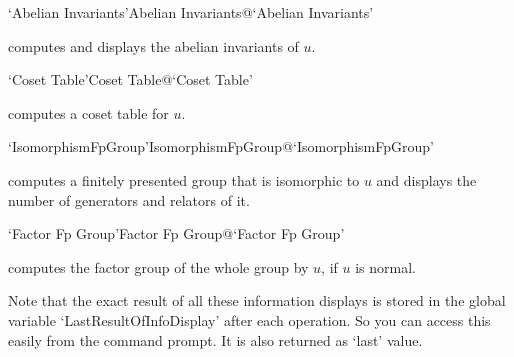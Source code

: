 \>`Abelian Invariants'{Abelian Invariants}@{`Abelian Invariants'}

computes  and  displays  the  abelian invariants  of  $u$.

\>`Coset Table'{Coset Table}@{`Coset Table'}

computes   a   coset table for   $u$.

\>`IsomorphismFpGroup'{IsomorphismFpGroup}@{`IsomorphismFpGroup'}

computes a finitely presented group that is isomorphic to $u$ and displays
the number of generators and relators of it.

\>`Factor Fp Group'{Factor Fp Group}@{`Factor Fp Group'}

computes the factor group  of the whole group by $u$, if $u$ is normal.

\bigskip%

Note that the exact result of all these information displays is stored in
the global variable `LastResultOfInfoDisplay' after each operation. So you
can access this easily from the {\GAP} command prompt. It is also returned
as `last' value.


